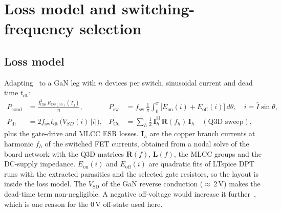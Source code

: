 \documentclass[10pt,a4paper]{article}
\begin{document}
\section{Loss model and switching-frequency selection}\label{sec:loss}
\subsection{Loss model}
Adapting~\cite{zou2025} to a GaN leg with $n$ devices per switch, sinusoidal current and dead time $t_\mathrm{dt}$:
\begin{align}
P_\mathrm{cond}&=\frac{I_\mathrm{rms}^2\,R_\mathrm{DS(on)}(T_j)}{n}, &
P_\mathrm{sw}&=f_\mathrm{sw}\,\frac1\pi\int_0^\pi\!\big[E_\mathrm{on}(i)+E_\mathrm{off}(i)\big]\,d\theta,\quad i=\hat I\sin\theta,\\
P_\mathrm{dt}&=2f_\mathrm{sw}t_\mathrm{dt}\,\overline{\big(V_{SD}(i)\,|i|\big)}, &
P_\mathrm{Cu}&=\sum_h \tfrac12\,\mathbf{I}_h^\mathsf{H}\,\mathbf{R}(f_h)\,\mathbf{I}_h\quad(\text{Q3D sweep}),
\end{align}
plus the gate-drive and MLCC ESR losses. $\mathbf{I}_h$ are the copper branch currents at harmonic $f_h$ of the switched FET currents, obtained from a nodal solve of the board network with the Q3D matrices $\mathbf{R}(f)$, $\mathbf{L}(f)$, the MLCC groups and the DC-supply impedance.
$E_\mathrm{on}(i)$ and $E_\mathrm{off}(i)$ are quadratic fits of LTspice DPT runs with the extracted parasitics and the selected gate resistors, so the layout is inside the loss model.
The $V_\mathrm{SD}$ of the GaN reverse conduction ($\approx$\,2\,V) makes the dead-time term non-negligible. A negative off-voltage would increase it further~\cite{tran2025,wattenberg2023}, which is one reason for the 0\,V off-state used here.
\end{document}
